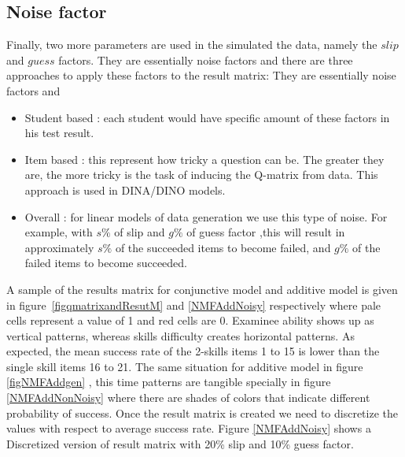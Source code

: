 \subsection{Noise factor}
\label{Noise_}
Finally, two more parameters are used in the simulated the data, namely the $\mathit{slip}$ and $\mathit{guess}$ factors. They are essentially noise factors and there are three approaches to apply these factors to the result matrix:
They are essentially noise factors and 
\begin{itemize}
\item Student based : each student would have specific amount of these factors in his test result.
\item Item based : this represent how tricky a question can be. The greater they are, the more tricky is the task of inducing the Q-matrix from data. This approach is used in DINA/DINO models.
\item Overall : for linear models of data generation we use this type of noise. For example, with $s\%$ of slip and $g\%$ of guess factor ,this will result in approximately $s\%$ of the succeeded items to become failed, and $g\%$ of the failed items to become succeeded.

\end{itemize}

A sample of the results matrix for conjunctive model and additive model is given in figure~\ref{figqmatrixandResutM} and  \ref{NMFAddNoisy} respectively where pale cells represent a value of 1 and red cells are 0. Examinee ability shows up as vertical patterns, whereas skills difficulty creates horizontal patterns. As expected, the mean success rate of the 2-skills items 1 to 15 is lower than the single skill items 16 to 21. The same situation for additive model in figure \ref{figNMFAddgen} , this time patterns are tangible specially in figure \ref{NMFAddNonNoisy} where there are shades of colors that indicate different probability of success. Once the result matrix is created we need to discretize the values with respect to average success rate. Figure \ref{NMFAddNoisy} shows a Discretized version of result matrix with 20\% slip and 10\% guess factor.

